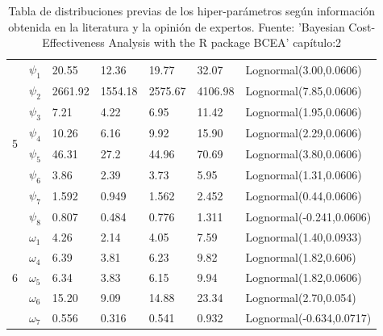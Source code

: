 \documentclass[12pt]{article}
\begin{document}
\begin{table}[]
\begin{tabular}{|l|l|l|l|l|l|l|}
\multirow{8}{*}{5} & $\psi_1$   & 20.55    & 12.36    & 19.77    & 32.07    & Lognormal(3.00,0.0606)    \\ \cline{2-7} 
                   & $\psi_2$   & 2661.92  & 1554.18  & 2575.67  & 4106.98  & Lognormal(7.85,0.0606)    \\ \cline{2-7} 
                   & $\psi_3$   & 7.21     & 4.22     & 6.95     & 11.42    & Lognormal(1.95,0.0606)    \\ \cline{2-7} 
                   & $\psi_4$   & 10.26    & 6.16     & 9.92     & 15.90    & Lognormal(2.29,0.0606)    \\ \cline{2-7} 
                   & $\psi_5$   & 46.31    & 27.2     & 44.96    & 70.69    & Lognormal(3.80,0.0606)    \\ \cline{2-7} 
                   & $\psi_6$   & 3.86     & 2.39     & 3.73     & 5.95     & Lognormal(1.31,0.0606)    \\ \cline{2-7} 
                   & $\psi_7$   & 1.592    & 0.949    & 1.562    & 2.452    & Lognormal(0.44,0.0606)    \\ \cline{2-7} 
                   & $\psi_8$   & 0.807    & 0.484    & 0.776    & 1.311    & Lognormal(-0.241,0.0606)  \\ \hline
\multirow{5}{*}{6} & $\omega_1$ & 4.26     & 2.14     & 4.05     & 7.59     & Lognormal(1.40,0.0933)    \\ \cline{2-7} 
                   & $\omega_4$ & 6.39     & 3.81     & 6.23     & 9.82     & Lognormal(1.82,0.606)     \\ \cline{2-7} 
                   & $\omega_5$ & 6.34     & 3.83     & 6.15     & 9.94     & Lognormal(1.82,0.0606)    \\ \cline{2-7} 
                   & $\omega_6$ & 15.20    & 9.09     & 14.88    & 23.34    & Lognormal(2.70,0.054)     \\ \cline{2-7} 
                   & $\omega_7$ & 0.556    & 0.316    & 0.541    & 0.932    & Lognormal(-0.634,0.0717)  \\ \hline
\end{tabular}
\caption{Tabla de distribuciones previas de los hiper-parámetros según información obtenida en la literatura y la opinión de expertos.
Fuente: 'Bayesian Cost-Effectiveness Analysis with the R package BCEA' capítulo:2}
\label{tabla:99}
\end{table}
\end{document}
